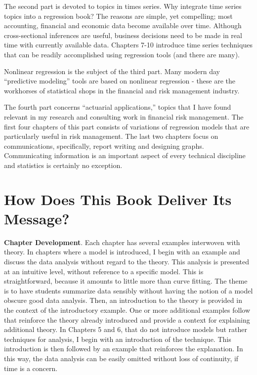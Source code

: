 The second part is devoted to topics in times series. Why integrate
time series topics into a regression book? The reasons are simple,
yet compelling; most accounting, financial and economic data become
available over time. Although cross-sectional inferences are useful,
business decisions need to be made in real time with currently
available data. Chapters 7-10 introduce time series techniques that
can be readily accomplished using regression tools (and there are
many).

Nonlinear regression is the subject of the third part. Many modern
day ``predictive modeling'' tools are based on nonlinear regression
- these are the workhorses of statistical shops in the financial and
risk management industry.

The fourth part concerns ``actuarial applications,'' topics that I
have found relevant in my research and consulting work in financial
risk management. The first four chapters of this part consists of
variations of regression models that are particularly useful in risk
management. The last two chapters focus on communications,
specifically, report writing and designing graphs. Communicating
information is an important aspect of every technical discipline and
statistics is certainly no exception.


\section*{How Does This Book Deliver Its Message?}


\textbf{Chapter Development}. Each chapter has several examples
interwoven with theory. In chapters where a model is introduced, I
begin with an example and discuss the data analysis without regard
to the theory. This analysis is presented at an intuitive level,
without reference to a specific model. This is straightforward,
because it amounts to little more than curve fitting. The theme is
to have students summarize data sensibly without having the notion
of a model obscure good data analysis. Then, an introduction to the
theory is provided in the context of the introductory example. One
or more additional examples follow that reinforce the theory already
introduced and provide a context for explaining additional theory.
In Chapters 5 and 6, that do not introduce models but rather
techniques for analysis, I begin with an introduction of the
technique. This introduction is then followed by an example that
reinforces the explanation. In this way, the data analysis can be
easily omitted without loss of continuity, if time is a concern.

